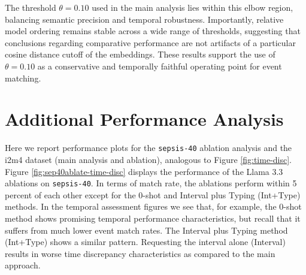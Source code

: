 \documentclass[pmlr,twocolumn,10pt]{jmlr} %
\begin{document}
The threshold $\theta = 0.10$ used in the main analysis lies within this elbow region, balancing semantic precision and temporal robustness. Importantly, relative model ordering remains stable across a wide range of thresholds, suggesting that conclusions regarding comparative performance are not artifacts of a particular cosine distance cutoff of the embeddings.
These results support the use of $\theta = 0.10$ as a conservative and temporally faithful operating point for event matching.



\clearpage
\section{Additional Performance Analysis}\label{apd:add-perf}
Here we report performance plots for the \texttt{sepsis-40} ablation analysis and the i2m4 dataset (main analysis and ablation), analogous to Figure \ref{fig:time-disc}. Figure \ref{fig:sep40ablate-time-disc} displays the performance of the Llama 3.3 ablations on \texttt{sepsis-40}.  In terms of match rate, the ablations perform within 5 percent of each other except for the 0-shot and Interval plus Typing (Int+Type) methods.  In the temporal assessment figures we see that, for example, the 0-shot method shows promising temporal performance characteristics, but recall that it suffers from much lower event match rates. The Interval plus Typing method (Int+Type) shows a similar pattern.  Requesting the interval alone (Interval) results in worse time discrepancy characteristics as compared to the main approach.  
\end{document}

